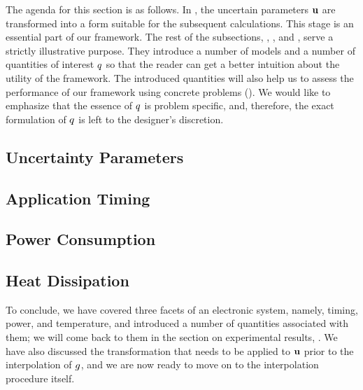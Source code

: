 The agenda for this section is as follows. In , the uncertain
parameters $\mathbf{u}$ are transformed into a form suitable for the subsequent
calculations. This stage is an essential part of our framework. The rest of the
subsections, , , and , serve a strictly
illustrative purpose. They introduce a number of models and a number of
quantities of interest $q$ so that the reader can get a better intuition about
the utility of the framework. The introduced quantities will also help us to
assess the performance of our framework using concrete problems
(). We would like to emphasize that the essence of $q$ is
problem specific, and, therefore, the exact formulation of $q$ is left to the
designer's discretion.

\subsection{Uncertainty Parameters} 


\subsection{Application Timing} 


\subsection{Power Consumption} 


\subsection{Heat Dissipation} 


To conclude, we have covered three facets of an electronic system, namely,
timing, power, and temperature, and introduced a number of quantities associated
with them; we will come back to them in the section on experimental results,
. We have also discussed the transformation that needs to
be applied to $\mathbf{u}$ prior to the interpolation of $g$, and we are now ready to
move on to the interpolation procedure itself.
